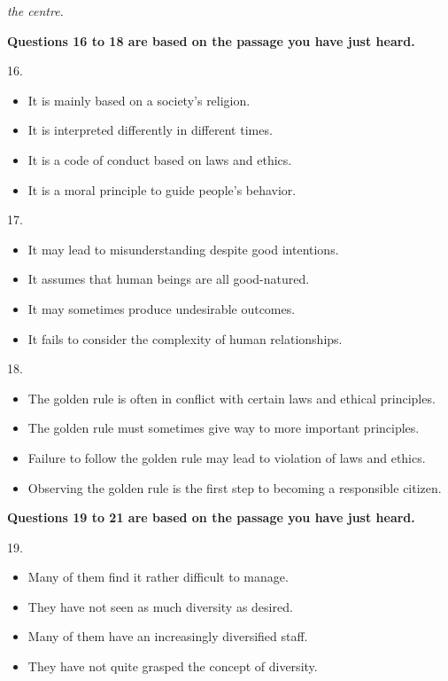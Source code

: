 \documentclass[UTF8,11pt]{ctexart}
\begin{document}
\textit{the centre.}


\textbf{Questions 16 to 18 are based on the passage you have just heard.}


16.


\begin{itemize}[leftmargin=2em,itemsep=.2em,topsep=.4em]\item[A.] It is mainly based on a society's religion.
\item[B.] It is interpreted differently in different times.
\item[C.] It is a code of conduct based on laws and ethics.
\item[D.] It is a moral principle to guide people's behavior.
\end{itemize}

17.


\begin{itemize}[leftmargin=2em,itemsep=.2em,topsep=.4em]\item[A.] It may lead to misunderstanding despite good intentions.
\item[B.] It assumes that human beings are all good-natured.
\item[C.] It may sometimes produce undesirable outcomes.
\item[D.] It fails to consider the complexity of human relationships.
\end{itemize}

18.


\begin{itemize}[leftmargin=2em,itemsep=.2em,topsep=.4em]\item[A.] The golden rule is often in conflict with certain laws and ethical principles.
\item[B.] The golden rule must sometimes give way to more important principles.
\item[C.] Failure to follow the golden rule may lead to violation of laws and ethics.
\item[D.] Observing the golden rule is the first step to becoming a responsible citizen.
\end{itemize}

\textbf{Questions 19 to 21 are based on the passage you have just heard.}


19.


\begin{itemize}[leftmargin=2em,itemsep=.2em,topsep=.4em]\item[A.] Many of them find it rather difficult to manage.
\item[B.] They have not seen as much diversity as desired.
\item[C.] Many of them have an increasingly diversified staff.
\item[D.] They have not quite grasped the concept of diversity.
\end{itemize}
\end{document}
